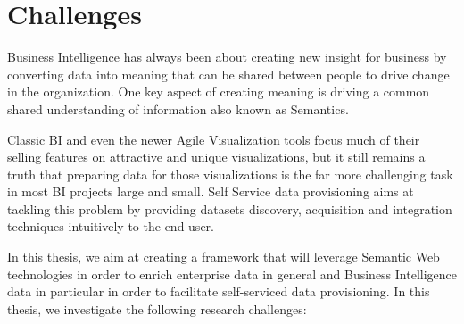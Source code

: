 \documentclass[onecolumn, crcready]{iosart2c}
\begin{document}

\section{Challenges}
Business Intelligence has always been about creating new insight for business by converting data into meaning that can be shared between people to drive change in the organization. One key aspect of creating meaning is driving a common shared understanding of information also known as Semantics.

Classic BI and even the newer Agile Visualization tools focus much of their selling features on attractive and unique visualizations, but it still remains a truth that preparing data for those visualizations is the far more challenging task in most BI projects large and small. Self Service data provisioning aims at tackling this problem by providing datasets discovery, acquisition and integration techniques intuitively to the end user.

In this thesis, we aim at creating a framework that will leverage Semantic Web technologies in order to enrich enterprise data in general and Business Intelligence data in particular in order to facilitate self-serviced data provisioning. In this thesis, we investigate the following research challenges:
\end{document}
